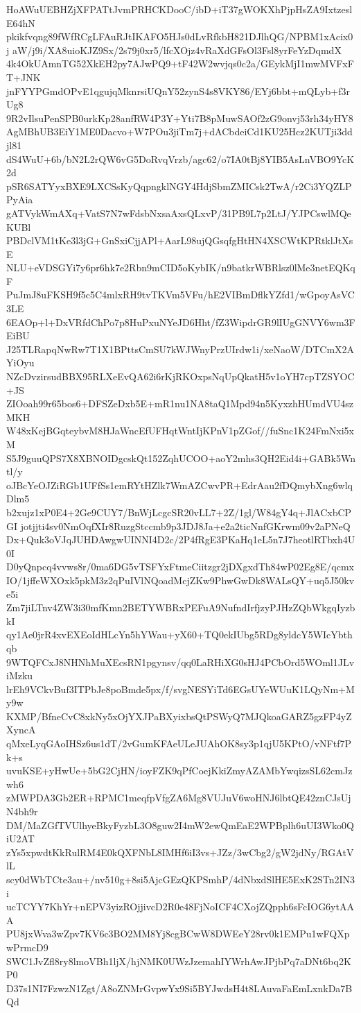 HoAWuUEBHZjXFPATtJvmPRHCKDooC/ibD+iT37gWOKXhPjpHsZA9IxtzeslE64hN
pkikfvqng89fWfRCgLFAuRJtIKAFO5HJs0dLvRfkbH821DJlhQG/NPBM1xAcix0j
aW/j9i/XA8uioKJZ9Sx/2s79j0xr5/lfcXOjz4vRaXdGFsOl3Fsl8yrFeYzDqmdX
4k4OkUAmnTG52XkEH2py7AJwPQ9+tF42W2wvjqs0c2a/GEykMjI1mwMVFxFT+JNK
jnFYYPGmdOPvE1qgujqMknrsiUQnY52zynS4s8VKY86/EYj6bbt+mQLyb+f3rUg8
9R2vIlsuPenSPB0urkKp28anfRW4P3Y+Yti7B8pMuwSAOf2zG9onvj53rh34yHY8
AgMBhUB3EiY1ME0Dacvo+W7POu3jiTm7j+dACbdeiCd1KU25Hcz2KUTji3ddjl81
dS4WuU+6b/bN2L2rQW6vG5DoRvqVrzb/agc62/o7IA0tBj8YIB5AsLnVBO9YcK2d
pSR6SATYyxBXE9LXCSsKyQqpngklNGY4HdjSbmZMICsk2TwA/r2Ci3YQZLPPyAia
gATVykWmAXq+VatS7N7wFdsbNxsaAxsQLxvP/31PB9L7p2LtJ/YJPCswlMQeKUBl
PBDclVM1tKe3l3jG+GnSxiCjjAPl+AarL98ujQGsqfgHtHN4XSCWtKPRtklJtXsE
NLU+eVDSGYi7y6pr6hk7e2Rbn9mCID5oKybIK/n9batkrWBRlsz0lMe3netEQKqF
PuJmJ8uFKSH9f5c5C4mlxRH9tvTKVm5VFu/hE2VIBmDflkYZfd1/wGpoyAsVC3LE
6EAOp+l+DxVRfdChPo7p8HuPxuNYeJD6Hht/fZ3WipdrGR9lIUgGNVY6wm3FEiBU
J25TLRapqNwRw7T1X1BPttsCmSU7kWJWnyPrzUIrdw1i/xeNaoW/DTCmX2AYiOyu
NZcDvzirsudBBX95RLXeEvQA62i6rKjRKOxpsNqUpQkatH5v1oYH7cpTZSYOC+JS
ZIOoah99r65bos6+DFSZeDxb5E+mR1nu1NA8taQ1Mpd94n5KyxzhHUmdVU4szMKH
W48xKejBGqteybvM8HJaWncEfUFHqtWntIjKPnV1pZGof//fuSnc1K24FmNxi5xM
S5J9guuQPS7X8XBNOIDgcskQt152ZqhUCOO+aoY2mhs3QH2Eid4i+GABk5Wntl/y
oJBcYeOJZiRGb1UFfSs1emRYtHZlk7WmAZCwvPR+EdrAau2fDQmybXng6wlqDlm5
b2xujz1xP0E4+2Ge9CUY7/BnWjLcgcSR20vLL7+2Z/1gl/W84gY4q+JlACxbCPGI
jotjjti4sv0NmOqfXIr8RuzgStccmb9p3JDJ8Ja+e2a2ticNnfGKrwm09v2aPNeQ
Dx+Quk3oVJqJUHDAwgwUINNI4D2c/2P4fRgE3PKaHq1eL5n7J7heotlRTbxh4U0I
D0yQnpcq4vvws8r/0ma6DG5vTSFYxFtmeCiitzgr2jDXgxdTh84wP02Eg8E/qcmx
IO/1jffeWXOxk5pkM3z2qPuIVlNQoadMcjZKw9PhwGwDk8WALsQY+uq5J50kve5i
Zm7jiLTnv4ZW3i30mfKmn2BETYWBRxPEFuA9NufndIrfjzyPJHzZQbWkgqIyzbkI
qy1Ae0jrR4xvEXEoIdHLcYn5hYWau+yX60+TQ0ekIUbg5RDg8yldcY5WIcYbthqb
9WTQFCxJ8NHNhMuXEcsRN1pgynsv/qq0LaRHiXG0sHJ4PCbOrd5WOml1JLviMzku
lrEh9VCkvBuf3ITPbJe8poBmde5px/f/svgNESYiTd6EGsUYeWUuK1LQyNm+My9w
KXMP/BfneCvC8xkNy5xOjYXJPaBXyixbsQtPSWyQ7MJQkoaGARZ5gzFP4yZXyncA
qMxeLyqGAoIHSz6us1dT/2vGumKFAeULeJUAhOK8sy3p1qjU5KPtO/vNFtf7Pk+s
uvuKSE+yHwUe+5bG2CjHN/ioyFZK9qPfCoejKkiZmyAZAMbYwqizsSL62cmJzwh6
zMWPDA3Gb2ER+RPMC1meqfpVfgZA6Mg8VUJuV6woHNJ6lbtQE42znCJsUjN4bh9r
DM/MaZGfTVUlhyeBkyFyzbL3O8guw2I4mW2ewQmEaE2WPBplh6uUI3Wko0QiU2AT
zYs5xpwdtKkRulRM4E0kQXFNbL8IMHf6iI3vs+JZz/3wCbg2/gW2jdNy/RGAtVlL
scy0dWbTCte3au+/nv510g+8si5AjcGEzQKPSmhP/4dNbxdSlHE5ExK2STn2IN3i
ucTCYY7KhYr+nEPV3yizROjjivcD2R0e48FjNoICF4CXojZQpph6sFcIOG6ytAAA
PU8jxWva3wZpv7KV6c3BO2MM8Yj8cgBCwW8DWEeY28rv0k1EMPu1wFQXpwPrmcD9
SWC1JvZfl8ry8lmoVBh1ljX/hjNMK0UWzJzemahIYWrhAwJPjbPq7aDNt6bq2KP0
D37s1NI7FzwzN1Zgt/A8oZNMrGvpwYx9Si5BYJwdsH4t8LAuvaFaEmLxnkDa7BQd
